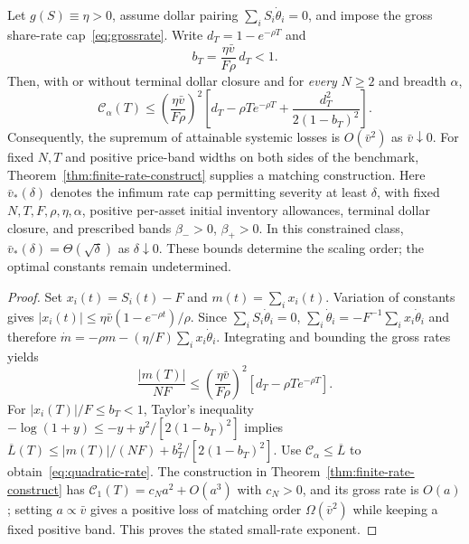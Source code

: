 \documentclass[review,hidelinks,onefignum,onetabnum]{siamonline250211}
\begin{document}
\begin{theorem}\label{thm:quadratic-rate}
Let $g(S)\equiv\eta>0$, assume dollar pairing $\sum_iS_i\dot\theta_i=0$, and impose the gross share-rate cap~\eqref{eq:grossrate}. Write $d_T=1-e^{-\rho T}$ and
\begin{equation}\label{eq:bsmall}
 b_T=\frac{\eta\bar v}{F\rho}\,d_T<1.
\end{equation}
Then, with or without terminal dollar closure and for \emph{every} $N\ge2$ and breadth $\alpha$,
\begin{equation}\label{eq:quadratic-rate}
\boxed{\ \mathcal C_\alpha(T)\le
\left(\frac{\eta\bar v}{F\rho}\right)^2
\left[d_T-\rho T e^{-\rho T}
 +\frac{d_T^2}{2(1-b_T)^2}\right].\ }
\end{equation}
Consequently, the supremum of attainable systemic losses is $O(\bar v^2)$ as $\bar v\downarrow0$. For fixed $N,T$ and positive price-band widths on both sides of the benchmark, Theorem~\ref{thm:finite-rate-construct} supplies a matching construction. Here $\bar v_*(\delta)$ denotes the infimum rate cap permitting severity at least $\delta$, with fixed $N,T,F,\rho,\eta,\alpha$, positive per-asset initial inventory allowances, terminal dollar closure, and prescribed bands $\beta_->0$, $\beta_+>0$. In this constrained class, $\bar v_*(\delta)=\Theta(\sqrt\delta)$ as $\delta\downarrow0$. These bounds determine the scaling order; the optimal constants remain undetermined.
\end{theorem}
\begin{proof}
Set $x_i(t)=S_i(t)-F$ and $m(t)=\sum_i x_i(t)$. Variation of constants gives
$|x_i(t)|\le\eta\bar v(1-e^{-\rho t})/\rho$. Since $\sum_iS_i\dot\theta_i=0$,
$\sum_i\dot\theta_i=-F^{-1}\sum_i x_i\dot\theta_i$ and therefore
$\dot m=-\rho m-(\eta/F)\sum_i x_i\dot\theta_i$. Integrating and bounding the gross rates yields
\begin{equation}\label{eq:meanprice}
\frac{|m(T)|}{NF}\le
\left(\frac{\eta\bar v}{F\rho}\right)^2
 [d_T-\rho T e^{-\rho T}].
\end{equation}
For $|x_i(T)|/F\le b_T<1$, Taylor's inequality
$-\log(1+y)\le-y+y^2/[2(1-b_T)^2]$ implies
$\overline L(T)\le |m(T)|/(NF)+b_T^2/[2(1-b_T)^2]$.
Use $\mathcal C_\alpha\le\overline L$ to obtain~\eqref{eq:quadratic-rate}. The construction in Theorem~\ref{thm:finite-rate-construct} has $\mathcal C_1(T)=c_Na^2+O(a^3)$ with $c_N>0$, and its gross rate is $O(a)$; setting $a\propto\bar v$ gives a positive loss of matching order $\Omega(\bar v^2)$ while keeping a fixed positive band. This proves the stated small-rate exponent.
\end{proof}
\end{document}
